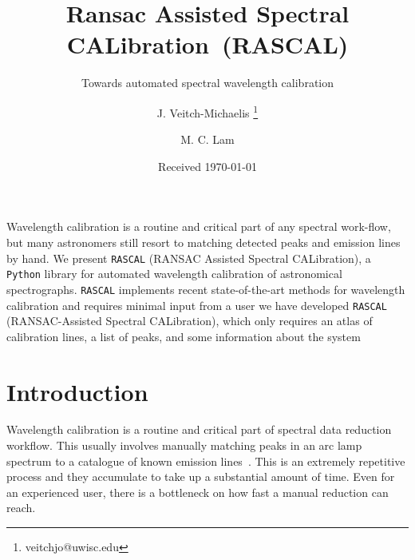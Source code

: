 \documentclass{aa}
\begin{document}
 

   \title{Ransac Assisted Spectral CALibration~(RASCAL)}

   \subtitle{Towards automated spectral wavelength calibration}

   \author{J. Veitch-Michaelis
          \fnmsep\thanks{veitchjo@uwisc.edu}
          \and
          M. C. Lam
          }


   \date{Received \today}

 
  \abstract
   {Wavelength calibration is a routine and critical part of any spectral work-flow, but many astronomers still resort to matching detected peaks and emission lines by hand.}
   {We present \texttt{RASCAL} (RANSAC Assisted Spectral CALibration), a \texttt{Python} library for automated wavelength calibration of astronomical spectrographs. \texttt{RASCAL} implements recent state-of-the-art methods for wavelength calibration and requires minimal input from a user}
   {}
   {we have developed \texttt{RASCAL} (RANSAC-Assisted Spectral CALibration), which only requires an atlas of calibration lines, a list of peaks,
and some information about the system}
   {}


   \maketitle
%
\section{Introduction}
Wavelength calibration is a routine and critical part of spectral data reduction
workflow. This usually involves manually matching peaks in an arc lamp spectrum to a
catalogue of known emission lines~\citep{2010MNRAS.409.1601B}. This is an extremely
repetitive process and they accumulate to take up a substantial amount of time.
Even for an experienced user, there is a bottleneck on how fast a manual reduction
can reach.
\end{document}
